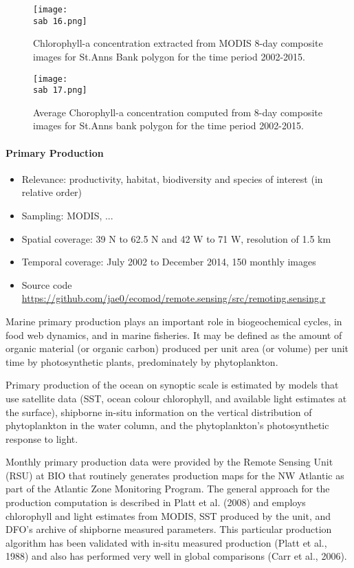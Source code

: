 \documentclass[letterpaper,portrait,11pt]{scrartcl}
\numberwithin{equation}{section}		%
\numberwithin{figure}{section}			%
\numberwithin{table}{section}				%
\newcommand{\ecomod}{\string~/ecomod_data/}   %
\newcommand{\sab}{\ecomod/mpa/sab/}   %
\begin{document}
\begin{figure}[h]
  \label{fig:modisChlaTS}
  \centering
  \texttt{[image: \\sab 16.png]}
  \caption{Chlorophyll-a concentration extracted from MODIS 8-day composite images for St.Anns Bank polygon for the time period 2002-2015.}
\end{figure}


\begin{figure}[h]
  \label{fig:ChlaSeasonal}
  \centering
  \texttt{[image: \\sab 17.png]}
  \caption {Average Chorophyll-a concentration computed from 8-day composite images for St.Anns bank polygon for the time period 2002-2015. }
\end{figure}



\paragraph{Primary Production}

\begin{itemize}
  \item Relevance:  productivity, habitat, biodiversity and species of interest (in relative order)
  \item Sampling:  MODIS, ...
  \item Spatial coverage: 39 N to 62.5 N and 42 W to 71 W, resolution of 1.5 km
  \item Temporal coverage: July 2002 to December 2014, 150 monthly  images
  \item Source code \url{https://github.com/jae0/ecomod/remote.sensing/src/remoting.sensing.r}
\end{itemize}



Marine primary production plays an important role in biogeochemical cycles, in food web dynamics, and in marine fisheries. It may be defined as the amount of organic material (or organic carbon) produced per unit area (or volume) per unit time by photosynthetic plants, predominately by phytoplankton.

Primary production of the ocean on synoptic scale is estimated by models that use satellite data (SST, ocean colour chlorophyll, and available light estimates at the surface), shipborne in-situ information on the vertical distribution of phytoplankton in the water column, and the phytoplankton’s photosynthetic response to light.

Monthly primary production data were provided by the Remote Sensing Unit (RSU) at BIO that routinely generates production maps for the NW Atlantic as part of the Atlantic Zone Monitoring Program. The general approach for the production computation is described in Platt et al. (2008) and employs chlorophyll and light estimates from MODIS, SST produced by the unit, and DFO’s archive of shipborne measured parameters. This particular production algorithm has been validated with in-situ measured production (Platt et al., 1988) and also has performed very well in global comparisons (Carr et al., 2006).
\end{document}
